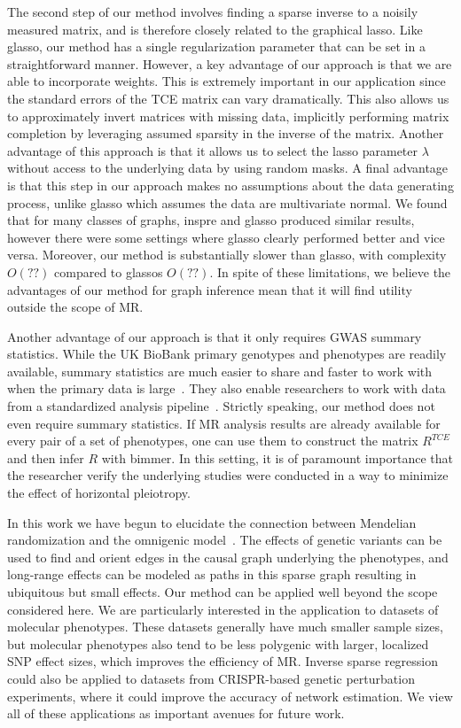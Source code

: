 \documentclass{article}
\begin{document}
The second step of our method involves finding a sparse inverse to a noisily measured
matrix, and is therefore closely related to the graphical lasso. Like glasso, our method
 has a single regularization parameter that can be set in a straightforward manner.
However, a key advantage of our approach is that we are able to incorporate
weights. This is extremely important in our application since the standard errors
of the TCE matrix can vary dramatically. This also allows us to approximately invert matrices
with missing data, implicitly performing matrix completion by leveraging assumed
sparsity in the inverse of the matrix. Another advantage
of this approach is that it allows us to select the lasso parameter $\lambda$ without
access to the underlying data by using random masks.
A final advantage is that this step in our approach makes no
assumptions about the data generating process, unlike glasso which assumes the data are
multivariate normal. We found that for many classes of graphs,
inspre and glasso produced similar results, however there were some settings where glasso
clearly performed better and vice versa.
Moreover, our method is substantially slower than glasso, with
complexity $O(??)$ compared to glassos $O(??)$. In spite of these limitations,
we believe the advantages of our method for graph inference mean that it will find utility
outside the scope of MR.

Another advantage of our approach is that it only requires GWAS summary statistics.
While the UK BioBank primary genotypes and phenotypes are readily available, summary
statistics are much easier to share and faster to work with when the primary
data is large~\cite{Pasaniuc2017}. They also enable researchers to work with data from a
standardized analysis pipeline~\cite{NealeUKBB}.
Strictly speaking, our method does not even require summary statistics. If
MR analysis results are already available for every pair of a set of phenotypes,
one can use them to construct the matrix $R^{TCE}$ and then infer $R$ with
bimmer. In this setting, it is of paramount importance that the researcher verify
the underlying studies were conducted in a way to minimize the effect of
horizontal pleiotropy.


In this work we have begun to elucidate the connection between Mendelian randomization
and the omnigenic model~\cite{Boyle2017}. The effects of genetic variants
can be used to find and orient edges
in the causal graph underlying the phenotypes, and long-range effects can be modeled
as paths in this sparse graph resulting in ubiquitous but small effects.
 Our method can be applied well beyond the scope considered
here. We are particularly interested in the application to datasets of molecular phenotypes.
These datasets generally have much smaller sample sizes, but molecular phenotypes also
tend to be less polygenic with larger, localized SNP effect sizes, which improves the efficiency
of MR. Inverse sparse regression could also be applied to datasets from CRISPR-based
genetic perturbation experiments, where it could improve the accuracy of network estimation.
We view all of these applications as important avenues for future work.
\end{document}
